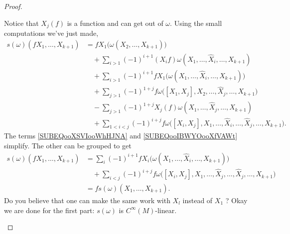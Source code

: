 \begin{proof}
\begin{subproof}
		Notice that \(  X_j(f)\) is a function and can get out of \( \omega\).
		Using the small computations we've just made,
		\begin{subequations}
			\begin{align}
				s(\omega)(fX_1,\ldots,X_{k+1}) & =fX_1\big( \omega(X_2,\ldots,X_{k+1}) \big)                                                                                                                             \\
				                               & \quad + \sum_{i>1}(-1)^{i+1}(X_if)\omega(X_1,\ldots,\hat X_i,\ldots,X_{k+1})                                                                                            \\
				                               & \quad + \sum_{i>1}(-1)^{i+1}fX_1\big( \omega(X_1,\ldots,\hat X_i,\ldots,X_{k+1}) \big)                           \label{SUBEQooXSVIooWhHJNA}                            \\
				                               & \quad +\sum_{j>1}(-1)^{1+j}f\omega\big( [X_1,X_j], X_2,\ldots, \hat X_j,\ldots,X_{k+1} \big)                                                                            \\
				                               & \quad - \sum_{j>1}(-1)^{1+j}X_j(f)\omega(X_1,\ldots,\hat X_j,\ldots,X_{k+1})                                                               \label{SUBEQooIBWYOooXfVAWt} \\
				                               & \quad + \sum_{1<i<j}(-1)^{i+j}f\omega\big( [X_i,X_j],X_1,\ldots,\hat X_i,\ldots,\hat X_j,\ldots,X_{k+1} \big).
			\end{align}
		\end{subequations}
		The terms \eqref{SUBEQooXSVIooWhHJNA} and \ref{SUBEQooIBWYOooXfVAWt} simplify. The other can be grouped to get
		\begin{subequations}
			\begin{align}
				s(\omega)(fX_1,\ldots,X_{k+1}) & = \sum_i(-1)^{i+1}fX_i\big( \omega(X_1,\ldots,\hat X_i,\ldots,X_{k+1}) \big)                                       \\
				                               & \quad\nonumber+\sum_{i<j}(-1)^{i+j}f\omega\big( [X_i,X_j],X_1,\ldots,\hat X_j,\ldots,\hat X_j,\ldots,X_{k+1} \big) \\
				                               & =fs(\omega)(X_1,\ldots,X_{k+1}).
			\end{align}
		\end{subequations}
		Do you believe that one can make the same work with \( X_l\) instead of \( X_1\) ? Okay we are done for the first part: \( s(\omega)\) is \( C^{\infty}(M)\)-linear.
	\end{subproof}

\end{proof}
